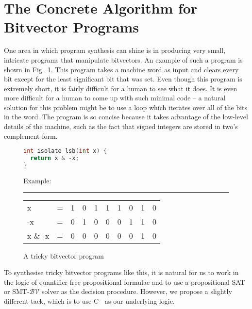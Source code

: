 \documentclass[a4paper]{llncs}
\newcommand{\newC}{C$^-$\xspace}
\begin{document}
\section{The Concrete Algorithm for Bitvector Programs}

One area in which program synthesis can shine is in producing very small,
intricate programs that manipulate bitvectors.  An example of such a program
is shown in Fig.~\ref{fig:bitvector-program}.  This program takes a machine word
as input and clears every bit except for the least significant bit that was set.
Even though this program is extremely short, it is fairly difficult for a human
to see what it does.  It is even more difficult for a human to come up with such
minimal code -- a natural solution for this problem might be to use a loop which
iterates over all of the bits in the word.  The program is so concise because it
takes advantage of the low-level details of the machine, such as the fact that
signed integers are stored in two's complement form.

\begin{figure}
\centering
\begin{minipage}{0.45\linewidth}
 \begin{lstlisting}[language=C]
int isolate_lsb(int x) {
  return x & -x;
}
 \end{lstlisting}
\end{minipage}
\begin{minipage}{0.45\linewidth}
 
Example:

\hrule

\begin{tabular}{llcccccccc}
 x       & = & 1 & 0 & 1 & 1 & 1 & 0 & 1 & 0 \\
 -x      & = & 0 & 1 & 0 & 0 & 0 & 1 & 1 & 0 \\
 x \& -x & = & 0 & 0 & 0 & 0 & 0 & 0 & 1 & 0
\end{tabular}
\end{minipage}


 \caption{A tricky bitvector program}
  \label{fig:bitvector-program}
\end{figure}


To synthesise tricky bitvector programs like this, it is natural for us to
work in the logic of quantifier-free propositional formulae and to use a
propositional SAT or SMT-$\mathcal{BV}$ solver as the decision procedure. 
However, we propose a slightly different tack, which is to use \newC as
our underlying logic.
\end{document}
